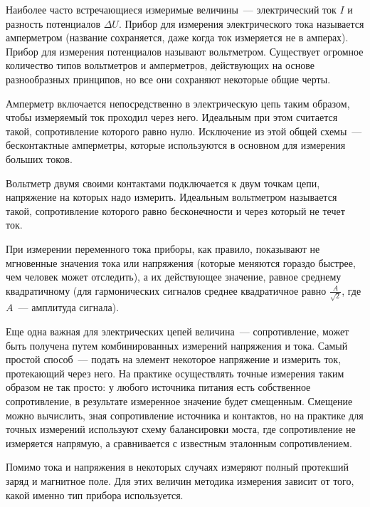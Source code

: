 
Наиболее часто встречающиеся измеримые величины~--- электрический ток $I$ и
разность потенциалов $\Delta U$. Прибор для измерения электрического тока
называется амперметром (название сохраняется, даже когда ток измеряется не в
амперах). Прибор для измерения потенциалов называют вольтметром. Существует
огромное количество типов вольтметров и амперметров, действующих на основе
разнообразных принципов, но все они сохраняют некоторые общие черты.

Амперметр включается непосредственно в электрическую цепь таким образом, чтобы
измеряемый ток проходил через него. Идеальным при этом считается такой,
сопротивление которого равно нулю. Исключение из этой общей схемы~---
бесконтактные амперметры, которые используются в основном для измерения больших
токов.

Вольтметр двумя своими контактами подключается к двум точкам цепи, напряжение на
которых надо измерить. Идеальным вольтметром называется такой, сопротивление
которого равно бесконечности и через который не течет ток.

При измерении переменного тока приборы, как правило, показывают не мгновенные
значения тока или напряжения (которые меняются гораздо быстрее, чем человек
может отследить), а их действующее значение, равное среднему квадратичному (для
гармонических сигналов среднее квадратичное равно $\frac{A}{\sqrt{2}}$, где
$A$~--- амплитуда сигнала).

Еще одна важная для электрических цепей величина~--- сопротивление, может быть
получена путем комбинированных измерений напряжения и тока. Самый простой
способ~--- подать на элемент некоторое напряжение и измерить ток, протекающий
через него. На практике осуществлять точные измерения таким образом не так
просто: у любого источника питания есть собственное сопротивление, в результате
измеренное значение будет смещенным. Смещение можно вычислить, зная
сопротивление источника и контактов, но на практике для точных измерений
используют схему балансировки моста, где сопротивление не измеряется напрямую, а
сравнивается с известным эталонным сопротивлением.

Помимо тока и напряжения в некоторых случаях измеряют полный протекший заряд и
магнитное поле. Для этих величин методика измерения зависит от того, какой
именно тип прибора используется.

